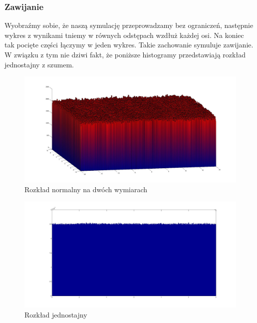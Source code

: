 \documentclass{mini}
\begin{document}
\subsubsection*{Zawijanie}
Wyobraźmy sobie, że naszą symulację przeprowadzamy bez ograniczeń, następnie wykres z wynikami tniemy w równych odstępach wzdłuż każdej osi. Na koniec tak pocięte części łączymy w jeden wykres. Takie zachowanie symuluje zawijanie. W związku z tym nie dziwi fakt, że poniższe histogramy przedstawiają rozkład jednostajny z szumem.
\begin{figure}[H]
\centering
\includegraphics[width=\textwidth]{w_n_10M_2__20_20__10_10_4_2}
\caption{Rozkład normalny na dwóch wymiarach}
\end{figure}

\begin{figure}[H]
\centering
\includegraphics[width=\textwidth]{w_j_20M_1__3_3}
\caption{Rozkład jednostajny}
\end{figure}
\end{document}
